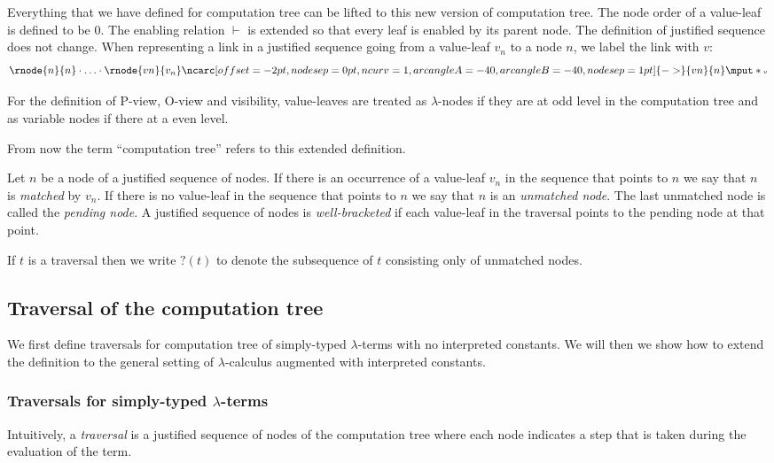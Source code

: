 \documentclass{llncs}
\newcommand{\bkptr}[2][nodesep=0pt]{\ncarc[offset=-2pt,nodesep=0pt,ncurv=1,arcangleA=-#2, arcangleB=-#2,#1]{->}}
\newcommand{\bklabel}[1]{\mput*{\mbox{{\tiny $#1$}}}}
\begin{document}
Everything that we have defined for computation tree can be lifted
to this new version of computation tree. The node order of a
value-leaf is defined to be $0$. The enabling relation $\vdash$ is
extended so that every leaf is enabled by its parent node. The
definition of justified sequence does not change.
When representing a link in a justified sequence going from a value-leaf $v_n$ to a node $n$,
we label the link with $v$:
$$
\rnode{n}{n} \cdot \ldots \cdot \rnode{vn}{v_n} \bkptr[nodesep=1pt]{40}{vn}{n} \bklabel{v}
$$


For the definition
of P-view, O-view and visibility, value-leaves are treated as
$\lambda$-nodes if they are at odd level in the computation tree and
as variable nodes if there at a even level.

From now the term ``computation tree'' refers to this extended
definition.
\vspace{10pt}

Let $n$ be a node of a justified sequence of nodes.
If there is an occurrence of a value-leaf $v_n$ in the sequence that points to $n$ we say that
$n$ is \emph{matched} by $v_n$. If there is no value-leaf in the sequence that points to $n$ we
say that $n$ is an \emph{unmatched node}.
The last unmatched node is called the \emph{pending node}.
A justified sequence of nodes is \emph{well-bracketed} if
each value-leaf in the traversal points to the pending node at that point.

If $t$ is a traversal then we write $?(t)$ to denote the subsequence
of $t$ consisting only of unmatched nodes.

\subsection{Traversal of the computation tree}
\label{subsec:traversal} We first define traversals for computation
tree of simply-typed $\lambda$-terms with no interpreted constants.
We will then we show how to extend the definition to the general
setting of $\lambda$-calculus augmented with interpreted constants.

\subsubsection{Traversals for simply-typed $\lambda$-terms}
Intuitively, a \emph{traversal} is a justified sequence of nodes of the computation tree where each node
indicates a step that is taken during the evaluation of the term.
\end{document}
